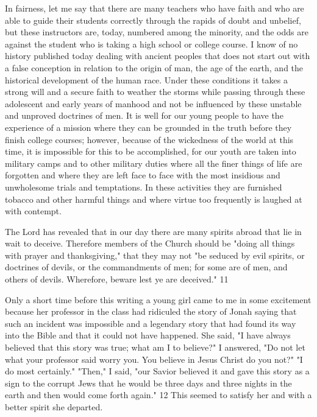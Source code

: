In fairness, let me say that there are many teachers who have faith and who are able to guide
their students correctly through the rapids of doubt and unbelief, but these instructors are,
today, numbered among the minority, and the odds are against the student who is taking a
high school or college course. I know of no history published today dealing with ancient
peoples that does not start out with a false conception in relation to the origin of man, the age
of the earth, and the historical development of the human race. Under these conditions it
takes a strong will and a secure faith to weather the storms while passing through these
adolescent and early years of manhood and not be influenced by these unstable and unproved
doctrines of men. It is well for our young people to have the experience of a mission where
they can be grounded in the truth before they finish college courses; however, because of the
wickedness of the world at this time, it is impossible for this to be accomplished, for our
youth are taken into military camps and to other military duties where all the finer things of
life are forgotten and where they are left face to face with the most insidious and
unwholesome trials and temptations. In these activities they are furnished tobacco and other
harmful things and where virtue too frequently is laughed at with contempt.

The Lord has revealed that in our day there are many spirits abroad that lie in wait to deceive.
Therefore members of the Church should be "doing all things with prayer and thanksgiving,"
that they may not "be seduced by evil spirits, or doctrines of devils, or the commandments of
men; for some are of men, and others of devils. Wherefore, beware lest ye are deceived." 11

Only a short time before this writing a young girl came to me in some excitement because
her professor in the class had ridiculed the story of Jonah saying that such an incident was
impossible and a legendary story that had found its way into the Bible and that it could not
have happened. She said, "I have always believed that this story was true; what am I to
believe?" I answered, "Do not let what your professor said worry you. You believe in Jesus
Christ do you not?" "I do most certainly." "Then," I said, "our Savior believed it and gave
this story as a sign to the corrupt Jews that he would be three days and three nights in the
earth and then would come forth again." 12 This seemed to satisfy her and with a better spirit
she departed.

